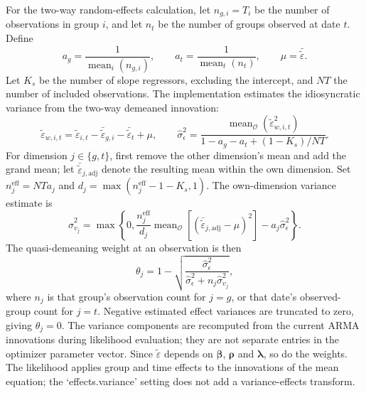 \documentclass[12pt]{article}
\begin{document}
For the two-way random-effects calculation, let $n_{g,i}=T_i$ be the number of observations in group $i$, and let $n_{t}$ be the number of groups observed at date $t$. Define
\begin{equation}
a_g=\frac{1}{\operatorname{mean}_i(n_{g,i})},\qquad
a_t=\frac{1}{\operatorname{mean}_t(n_t)},\qquad
\mu=\bar{\tilde{\varepsilon}}.
\label{eq:re-count-scales}
\end{equation}
Let $K_s$ be the number of slope regressors, excluding the intercept, and $NT$ the number of included observations. The implementation estimates the idiosyncratic variance from the two-way demeaned innovation:
\begin{equation}
\tilde{\varepsilon}_{w,i,t}=\tilde{\varepsilon}_{i,t}-\bar{\tilde{\varepsilon}}_{g,i}-\bar{\tilde{\varepsilon}}_{t}+\mu,
\qquad
\widehat{\sigma}_{\epsilon}^{2}
=\frac{\operatorname{mean}_{\mathcal O}(\tilde{\varepsilon}_{w,i,t}^{2})}
{1-a_g-a_t+(1-K_s)/NT}.
\label{eq:re-two-way-evar}
\end{equation}
For dimension $j\in\{g,t\}$, first remove the other dimension's mean and add the grand mean; let $\bar{\tilde{\varepsilon}}_{j,\mathrm{adj}}$ denote the resulting mean within the own dimension. Set $n_j^{\mathrm{eff}}=NTa_j$ and $d_j=\max(n_j^{\mathrm{eff}}-1-K_s,1)$. The own-dimension variance estimate is
\begin{equation}
\widehat{\sigma}_{v_j}^{2}
=\max\!\left\{0,
\frac{n_j^{\mathrm{eff}}}{d_j}
\operatorname{mean}_{\mathcal O}\!\left[
(\bar{\tilde{\varepsilon}}_{j,\mathrm{adj}}-\mu)^2\right]
-a_j\widehat{\sigma}_{\epsilon}^{2}\right\}.
\label{eq:re-two-way-vvar}
\end{equation}
The quasi-demeaning weight at an observation is then
\begin{equation}
\theta_{j}=1-\sqrt{\frac{\widehat{\sigma}_{\epsilon}^{2}}
{\widehat{\sigma}_{\epsilon}^{2}+n_{j}\widehat{\sigma}_{v_j}^{2}}},
\label{eq:re-two-way-theta}
\end{equation}
where $n_j$ is that group's observation count for $j=g$, or that date's observed-group count for $j=t$. Negative estimated effect variances are truncated to zero, giving $\theta_j=0$. The variance components are recomputed from the current ARMA innovations during likelihood evaluation; they are not separate entries in the optimizer parameter vector. Since $\tilde{\varepsilon}$ depends on $\boldsymbol{\beta}$, $\boldsymbol{\rho}$ and $\boldsymbol{\lambda}$, so do the weights. The likelihood applies group and time effects to the innovations of the mean equation; the `effects.variance' setting does not add a variance-effects transform.
\end{document}
